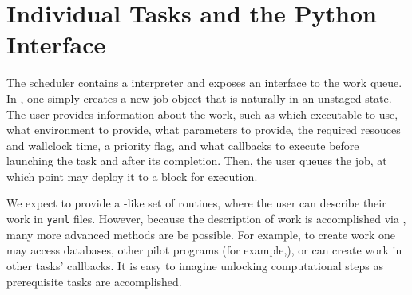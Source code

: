 \section{Individual Tasks and the Python Interface}
\label{sec:python}

The scheduler contains a \python interpreter and exposes an interface to the work queue.
In \python, one simply creates a new job object that is naturally in an unstaged state.
The user provides information about the work, such as which executable to use, what environment to provide, what parameters to provide, the required resouces and wallclock time, a priority flag, and what callbacks to execute before launching the task and after its completion.
Then, the user queues the job, at which point \jmscheduler may deploy it to a block for execution.

We expect to provide a \metaq-like set of routines, where the user can describe their work in \texttt{yaml}\cite{YAML} files.
However, because the description of work is accomplished via \python, many more advanced methods are be possible.
For example, to create work one may access databases, other pilot programs (for example,\cite{taxi}), or can create work in other tasks' callbacks.
It is easy to imagine unlocking computational steps as prerequisite tasks are accomplished.
